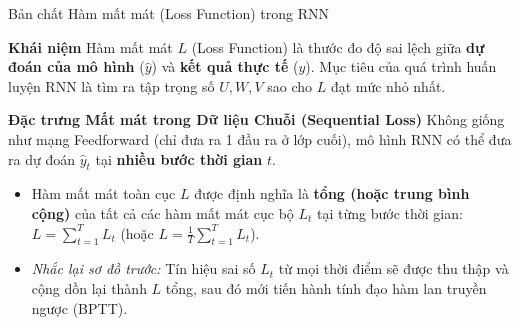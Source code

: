 \documentclass[aspectratio=169, 10pt]{beamer}
\begin{document}
\begin{frame}{Bản chất Hàm mất mát (Loss Function) trong RNN}
\small
\begin{block}{\textbf{Khái niệm}}
Hàm mất mát $L$ (Loss Function) là thước đo độ sai lệch giữa \textbf{dự đoán của mô hình} ($\hat{y}$) và \textbf{kết quả thực tế} ($y$). Mục tiêu của quá trình huấn luyện RNN là tìm ra tập trọng số $U, W, V$ sao cho $L$ đạt mức nhỏ nhất.
\end{block}

\vspace{0.1cm}
\begin{alertblock}{\textbf{Đặc trưng Mất mát trong Dữ liệu Chuỗi (Sequential Loss)}}
Không giống như mạng Feedforward (chỉ đưa ra 1 đầu ra ở lớp cuối), mô hình RNN có thể đưa ra dự đoán $\hat{y}_t$ tại \textbf{nhiều bước thời gian} $t$. 
\begin{itemize}
    \item Hàm mất mát toàn cục $L$ được định nghĩa là \textbf{tổng (hoặc trung bình cộng)} của tất cả các hàm mất mát cục bộ $L_t$ tại từng bước thời gian: $L = \sum_{t=1}^{T} L_t$ (hoặc $L = \frac{1}{T} \sum_{t=1}^{T} L_t$).
    \item \textit{Nhắc lại sơ đồ trước:} Tín hiệu sai số $L_t$ từ mọi thời điểm sẽ được thu thập và cộng dồn lại thành $L$ tổng, sau đó mới tiến hành tính đạo hàm lan truyền ngược (BPTT).
\end{itemize}
\end{alertblock}
\end{frame}
\end{document}

